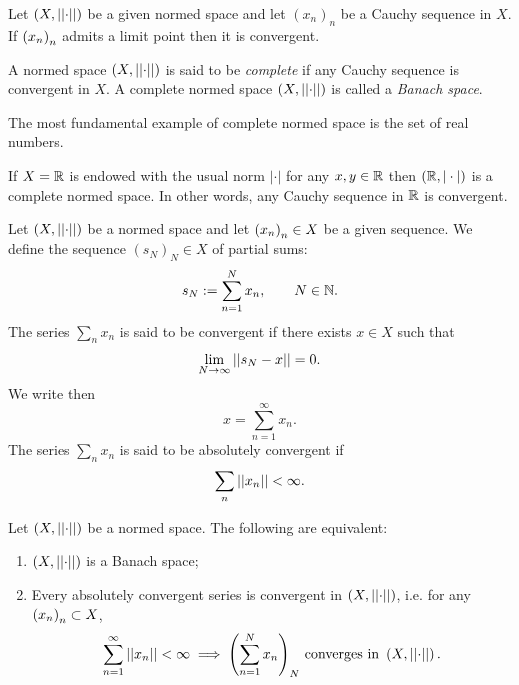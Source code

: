 \documentclass{article}
\begin{document}
\begin{lemma}
	Let $(X,\left|\left|\cdot\right|\right|)$ be a given normed space and let ${(x_{n})}_{n}$ be a Cauchy sequence in $X$. If ${\left({x}_{n}\right)}_{n}$ admits a limit point then it is convergent.
\end{lemma}
\begin{definition}
	A normed space $\left(X,\left|\left|\cdot\right|\right|\right)$ is said to be \emph{complete} if any Cauchy sequence is convergent in $X$. A complete normed space $\left(X,\left|\left|\cdot\right|\right|\right)$ is called a \emph{Banach space}.
\end{definition}
The most fundamental example of complete normed space is the set of real numbers.
\begin{theorem}
	If $X=\mathbb{R}$ is endowed with the usual norm $|\cdot|$ for any $x,y\in\mathbb{R}$ then $(\mathbb{R},|\cdot|)$ is a complete normed space. In other words, any Cauchy sequence in $\mathbb{R}$ is convergent.
\end{theorem}
\begin{definition}
	Let $\left(X,\left|\left|\cdot\right|\right|\right)$ be a normed space and let ${\left({x}_{n}\right)}_{n}\in X$ be a given sequence. We define the sequence ${(s_{N})}_{N}\in X$ of partial sums:
	\begin{equation*}
		s_{N}:=\sum_{n=1}^{N}x_{n},\qquad N\in\mathbb{N}.
	\end{equation*} 
	The series $\sum_{n}x_{n}$ is said to be convergent if there exists $x\in X$ such that
	\begin{equation*}
		\lim_{N\to\infty}\left|\left|s_{N}-x\right|\right|=0.
	\end{equation*}
	We write then 
	\begin{equation*}
		x=\sum_{n=1}^{\infty}x_{n}.
	\end{equation*}
	The series $\sum_{n}x_{n}$ is said to be absolutely convergent if 
	\begin{equation*}
		\sum_{n}\left|\left|x_{n}\right|\right|<\infty.
	\end{equation*}
\end{definition}
\begin{theorem}
	Let $\left(X,\left|\left|\cdot\right|\right|\right)$ be a normed space. The following are equivalent:
	\begin{enumerate}
		\item $\left(X,\left|\left|\cdot\right|\right|\right)$ is a Banach space;
		\item Every absolutely convergent series is convergent in $\left(X,\left|\left|\cdot\right|\right|\right)$, i.e. for any ${\left({x}_{n}\right)}_{n}\subset X$,
		\begin{equation*}
			\sum_{n=1}^{\infty}\left|\left|x_{n}\right|\right|<\infty\implies{\left(\sum_{n=1}^{N}x_{n}\right)}_N\text{ converges in }\left(X,\left|\left|\cdot\right|\right|\right).
		\end{equation*}
	\end{enumerate}
\end{theorem}\label{theo213}
\end{document}
